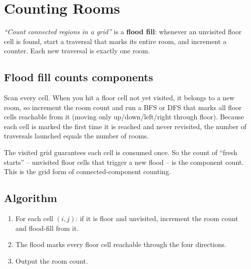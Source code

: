 \section{Counting Rooms}
\label{sec:cses-counting-rooms}


\begin{patternbox}
\emph{``Count connected regions in a grid''} is a \textbf{flood fill}:
whenever an unvisited floor cell is found, start a traversal that marks its
entire room, and increment a counter. Each new traversal is exactly one
room.
\end{patternbox}

\subsection*{Flood fill counts components}

Scan every cell. When you hit a floor cell not yet visited, it belongs to a
new room, so increment the room count and run a BFS or DFS that marks all
floor cells reachable from it (moving only up/down/left/right through
floor). Because each cell is marked the first time it is reached and never
revisited, the number of traversals launched equals the number of rooms.

\begin{ideabox}
The visited grid guarantees each cell is consumed once. So the count of
``fresh starts'' -- unvisited floor cells that trigger a new flood -- is the
component count. This is the grid form of connected-component counting.
\end{ideabox}

\subsection*{Algorithm}

\begin{enumerate}
  \item For each cell $(i,j)$: if it is floor and unvisited, increment the
        room count and flood-fill from it.
  \item The flood marks every floor cell reachable through the four
        directions.
  \item Output the room count.
\end{enumerate}

